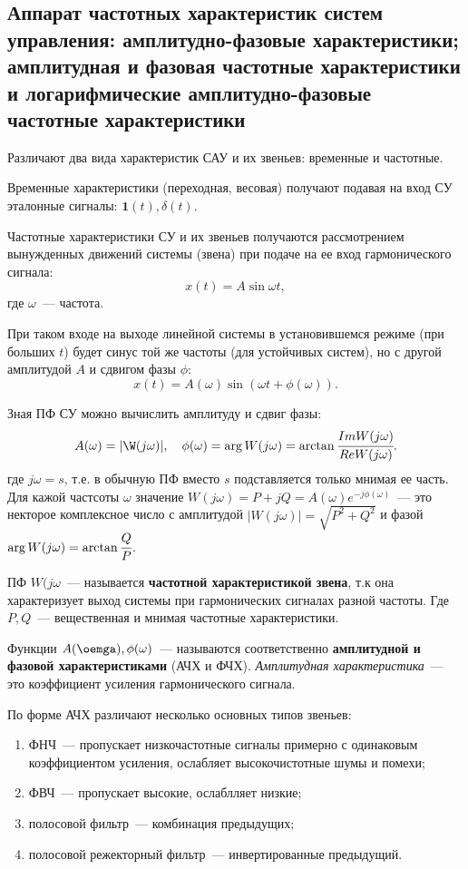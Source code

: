 \subsection{Аппарат частотных характеристик систем управления: амплитудно-фазовые 	характеристики; амплитудная и фазовая частотные характеристики и логарифмические 	амплитудно-фазовые частотные характеристики}

Различают два вида характеристик САУ и их звеньев: временные и частотные.

Временные характеристики (переходная, весовая) получают подавая на вход СУ эталонные сигналы: $\mathbf{1}(t), \delta(t)$. 

Частотные характеристики СУ и их звеньев получаются рассмотрением вынужденных движений системы (звена) при подаче на ее вход гармонического сигнала:
\begin{equation}
    x(t) = A \sin{\omega t},
\end{equation}
где $\omega$~--- частота.

При таком входе на выходе линейной системы в установившемся режиме (при больших $t$) будет синус той же частоты (для устойчивых систем), но с другой амплитудой $A$ и сдвигом фазы $\phi$:
\begin{equation}
    x(t) = A(\omega) \sin{(\omega t + \phi(\omega))}.
\end{equation}

Зная ПФ СУ можно вычислить амплитуду и сдвиг фазы:
\begin{equation}
    A(\omega) = |\W(j \omega)|, \quad \phi(\omega) = \arg{W(j \omega)} = \arctan{\cfrac{Im W(j \omega)}{Re W(j \omega)}}.
\end{equation}
где $j \omega = s$, т.е. в обычную ПФ вместо $s$ подставляется только мнимая ее часть.
Для кажой частсоты $\omega$ значение $W(j \omega) = P + jQ = A(\omega) e^{-j\phi(\omega)}$~--- это некторое комплексное число с амплитудой $|W(j \omega)| = \sqrt{P^2 + Q^2}$ и фазой $\arg W(j \omega) = \arctan{\cfrac{Q}{P}}$. 

ПФ $W(j \omega$~--- называется \textbf{частотной характеристикой звена}, т.к она характеризует выход системы при гармонических сигналах разной частоты. Где $P, Q$~--- вещественная и мнимая частотные характеристики.

Функции $A(\oemga), \phi(\omega)$~--- называются соответственно \textbf{амплитудной и фазовой характеристиками} (АЧХ и ФЧХ). \textit{Амплитудная характеристика}~--- это коэффициент усиления гармонического сигнала.

По форме АЧХ различают несколько основных типов звеньев:
\begin{enumerate}
    \item ФНЧ~--- пропускает низкочастотные сигналы примерно с одинаковым коэффициентом усиления, ослабляет высокочистотные шумы и помехи;
    \item ФВЧ~--- пропускает высокие, ослаблляет низкие;
    \item полосовой фильтр~--- комбинация предыдущих;
    \item полосовой режекторный фильтр~--- инвертированные предыдущий.
\end{enumerate}

